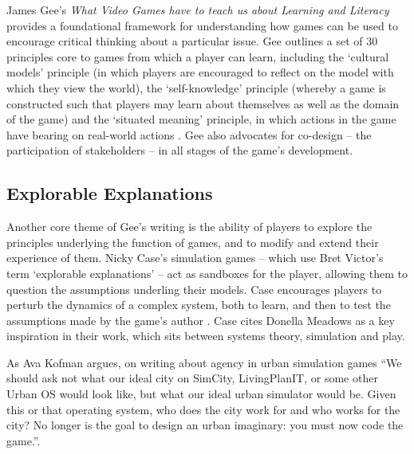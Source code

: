 \documentclass[nofonts,nols,justified,nobib]{tufte-book}
\begin{document}
James Gee's \emph{What Video Games have to teach us about Learning and Literacy} provides a foundational framework for understanding how games can be used to encourage critical thinking about a particular issue. Gee outlines a set of 30 principles core to games from which a player can learn, including the `cultural models' principle (in which players are encouraged to reflect on the model with which they view the world), the `self-knowledge' principle (whereby a game is constructed such that players may learn about themselves as well as the domain of the game) and the `situated meaning' principle, in which actions in the game have bearing on real-world actions \cite{gee_what_2004}. Gee also advocates for co-design -- the participation of stakeholders -- in all stages of the game's development.

\subsection*{Explorable Explanations}
Another core theme of Gee's writing is the ability of players to explore the principles underlying the function of games, and to modify and extend their experience of them. Nicky Case's simulation games -- which use Bret Victor's term `explorable explanations' -- act as sandboxes for the player, allowing them to question the assumptions underling their models. Case encourages players to perturb the dynamics of a complex system, both to learn, and then to test the assumptions made by the game's author \cite{case_how_2016}. Case cites Donella Meadows as a key inspiration in their work, which sits between systems theory, simulation and play.

As Ava Kofman argues, on writing about agency in urban simulation games ``We should ask not what our ideal city on SimCity, LivingPlanIT, or some other Urban OS would look like, but what our ideal urban simulator would be. Given this or that operating system, who does the city work for and who works for the city? No longer is the goal to design an urban imaginary: you must now code the game.''.
\end{document}

